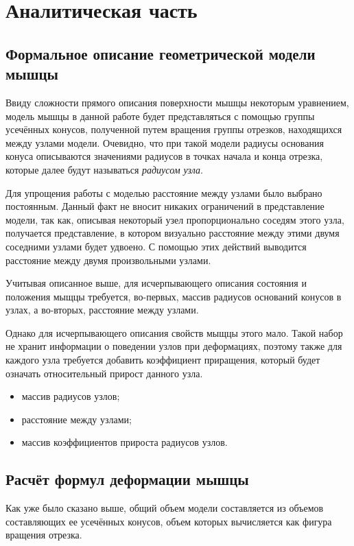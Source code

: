 \chapter{Аналитическая часть}

\section{Формальное описание геометрической модели мышцы}

Ввиду сложности прямого описания поверхности мышцы некоторым уравнением, модель мышцы в данной работе будет представляться с помощью группы усечённых конусов, полученной путем вращения группы отрезков, находящихся между узлами модели. Очевидно, что при такой модели радиусы основания конуса описываются значениями радиусов в точках начала и конца отрезка, которые далее будут называться \textit{радиусом узла}.

Для упрощения работы с моделью расстояние между узлами было выбрано постоянным. Данный факт не вносит никаких ограничений в представление модели, так как, описывая некоторый узел пропорционально соседям этого узла, получается представление, в котором визуально расстояние между этими двумя соседними узлами будет удвоено. С помощью этих действий выводится расстояние между двумя произвольными узлами.

Учитывая описанное выше, для исчерпывающего описания состояния и положения мыщцы требуется, во-первых, массив радиусов оснований конусов в узлах, а во-вторых, расстояние между узлами.

Однако для исчерпывающего описания свойств мыщцы этого мало. Такой набор не хранит информации о поведении узлов при деформациях, поэтому также для каждого узла требуется добавить коэффициент приращения, который будет означать относительный прирост данного узла.
\begin{itemize}
    \item массив радиусов узлов;
    \item расстояние между узлами;
    \item массив коэффициентов прироста радиусов узлов.
\end{itemize}

\section{Расчёт формул деформации мышцы}

Как уже было сказано выше, общий объем модели составляется из объемов составляющих ее усечённых конусов, объем которых вычисляется как фигура вращения отрезка. 

